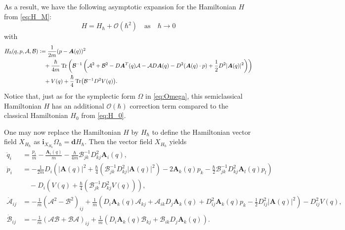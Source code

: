 \documentclass[10pt]{article}
\def\defeq{\mathrel{\mathop:}=}
\newcommand{\vect}[1]{\boldsymbol{#1}}
\begin{document}
As a result, we have the following asymptotic expansion for the Hamiltonian $H$ from \eqref{eq:H_M}:
\begin{equation*}
  H = H_{\hbar} + \mathcal{O}(\hbar^{2}) \quad \text{as} \quad \hbar \rightarrow 0
\end{equation*}
with
\begin{equation}
  \label{eq:H_hbar}
  \begin{split}
    H_{\hbar}(q, p, \mathcal{A}, \mathcal{B}) &\defeq \frac{1}{2m}(p - \vect{A}(q))^{2} \\
    &\quad+ \frac{\hbar}{4m} \Tr\left(
      \mathcal{B}^{-1} \left(
        \mathcal{A}^2 + \mathcal{B}^2 - D \vect{A}^T(q) \mathcal{A}  - \mathcal{A} D \vect{A}(q) - D^2 (\vect{A}(q) \cdot p) + \frac{1}{2}  D^2 |\vect{A}(q)|^2
      \right)
    \right)\\
    &\quad+ V(q) + \frac{\hbar}{4} \Tr (\mathcal{B}^{-1} D^2 V(q) ).
  \end{split}
\end{equation}
Notice that, just as for the symplectic form $\Omega$ in \eqref{eq:Omega}, this semiclassical Hamiltonian $H$ has an additional $\mathcal{O}(\hbar)$ correction term compared to the classical Hamiltonian $H_{0}$ from \eqref{eq:H_0}.

One may now replace the Hamiltonian $H$ by $H_{\hbar}$ to define the Hamiltonian vector field $X_{H_{\hbar}}$ as $\textbf{i}_{X_{H_{\hbar}}} \Omega_{\hbar} = \textbf{d}H_{\hbar}$.
Then the vector field $X_{H_{\hbar}}$ yields
\begin{equation}
  \label{eq:semiclassical}
  \begin{split}
    \dot{q}_i &= \frac{p_i}{m} -\frac{\vect{A}_i(q)}{m} - \frac{\hbar}{4m} \mathcal{B}_{jk}^{-1} D^2_{kj} \vect{A}_i(q), \\
    \dot{p}_i &=  - \frac{1}{2m}D_i \left(
      |\vect{A}(q)|^2 + \frac{\hbar}{4} ( \mathcal{B}_{jk}^{-1} D_{kj}^2 |\vect{A}(q)|^2 )
      -2\vect{A}_k(q) p_k  - \frac{\hbar}{2}  \mathcal{B}_{jk}^{-1} D^2_{kj} \vect{A}_l(q) p_l
    \right) \\
    &\quad - D_i \left( V(q) + \frac{\hbar}{4}(\mathcal{B}_{jk}^{-1} D_{kj}^2V(q)) \right),\\
    \dot{\mathcal{A}}_{ij} &=  - \frac{1}{m}( \mathcal{A}^2 - \mathcal{B}^2)_{ij} + \frac{1}{m} \left( D_i \vect{A}_k(q) \mathcal{A}_{kj}  + \mathcal{A}_{ik} D_j \vect{A}_k(q)  + D_{ij}^2 \vect{A}_k(q) p_k - \frac{1}{2} D_{ij}^2|\vect{A}(q)|^2 \right) - D_{ij}^2V(q),\\
    \dot{\mathcal{B}}_{ij} &=  - \frac{1}{m} (\mathcal{A}\mathcal{B} + \mathcal{B} \mathcal{A})_{ij} + \frac{1}{ m} ( D_{i} \vect{A}_k(q) \mathcal{B}_{kj} + \mathcal{B}_{ik} D_{j} \vect{A}_k(q) ).
  \end{split}
\end{equation}
\end{document}
